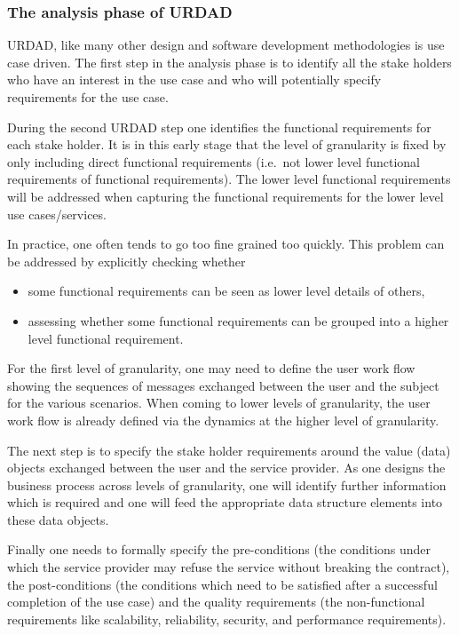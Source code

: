 \documentclass{IOS-Book-Article}
\begin{document}

\subsubsection{The analysis phase of URDAD}

URDAD, like many other design and software development methodologies is use
case driven. The first step in the analysis phase is to identify
all the stake holders who have an interest in the use case and who will
potentially specify requirements for the use case.

During the second URDAD step one identifies the functional requirements for each stake
holder. It is in this early stage that the level of granularity is fixed by only including
direct functional requirements (i.e.\ not lower level functional requirements of functional
requirements). The lower level functional requirements will be addressed when capturing
the functional requirements for the lower level use cases/services.

In practice, one often tends to go too fine grained too quickly. This problem can be addressed
by explicitly checking whether
\begin{itemize}
  \item some functional requirements can be seen as lower level details of others,
  \item assessing whether some functional requirements can be grouped into a higher
			level functional requirement.
\end{itemize}

For the first level of granularity, one may need to define the user work flow
showing the sequences of messages exchanged between the user and the subject
for the various scenarios. When coming to lower levels of granularity, the
user work flow is already defined via the dynamics at the higher level of
granularity.

The next step is to specify the stake holder requirements around the value
(data) objects exchanged between the user and the service provider. As one
designs the business process across levels of granularity, one will identify
further information which is required and one will feed the appropriate
data structure elements into these data objects.

Finally one needs to formally specify the pre-conditions (the conditions under
which the service provider may refuse the service without breaking the
contract), the post-conditions (the conditions which need to be satisfied after
a successful completion of the use case) and the quality requirements (the
non-functional requirements like scalability, reliability, security, and
performance requirements).
\end{document}
